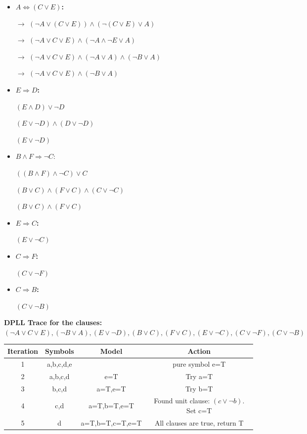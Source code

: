\documentclass{article}
\begin{document}
\begin{itemize}

\item{{\bf $A \Leftrightarrow (C \vee E)$:} 

  $\rightarrow$ $(\neg A \vee (C \vee E)) \wedge (\neg (C \vee E) \vee A)$

  $\rightarrow$ $(\neg A \vee C \vee E) \wedge (\neg A \wedge \neg E \vee A)$
  
  $\rightarrow$ $(\neg A \vee C \vee E) \wedge (\neg A \vee A) \wedge (\neg B \vee A)$

  $\rightarrow$ $(\neg A \vee C \vee E) \wedge (\neg B \vee A)$}

\item{{\bf $E \Rightarrow D$:}

  $(E \wedge D) \vee \neg D$

  $(E \vee \neg D) \wedge (D \vee \neg D)$

  $(E \vee \neg D)$}

\item{{\bf $B \wedge F \Rightarrow \neg C$}:
    
  $((B \wedge F) \wedge \neg C) \vee C$

  $(B \vee C) \wedge (F \vee C) \wedge (C \vee \neg C)$

  $(B \vee C) \wedge (F \vee C)$}

\item{{\bf $E \Rightarrow C$:}

  $(E \vee \neg C)$}

\item{{\bf $C \Rightarrow F$:}

  $(C \vee \neg F)$}

\item{{\bf $C \Rightarrow B$:}

  $(C \vee \neg B)$}

\end{itemize}


{\bf DPLL Trace for the clauses: $(\neg A \vee C \vee E),(\neg B \vee A),(E \vee \neg D),(B \vee C),(F \vee C),(E \vee \neg C),(C \vee \neg F),(C \vee \neg B)$}

\begin{tabular}{|c|c|c|c|}

\hline
{\bf Iteration} & {\bf Symbols} & {\bf Model} & {\bf Action} \\
\hline
1 & a,b,c,d,e & & pure symbol e=T \\
\hline
2 & a,b,c,d & e=T & Try a=T \\
\hline
3 & b,c,d & a=T,e=T & Try b=T \\
\hline
4 & c,d & a=T,b=T,e=T & Found unit clause: $(c \vee \neg b)$. Set c=T \\
\hline
5 & d & a=T,b=T,c=T,e=T & All clauses are true, return T \\
\hline
\end{tabular}
\end{document}
